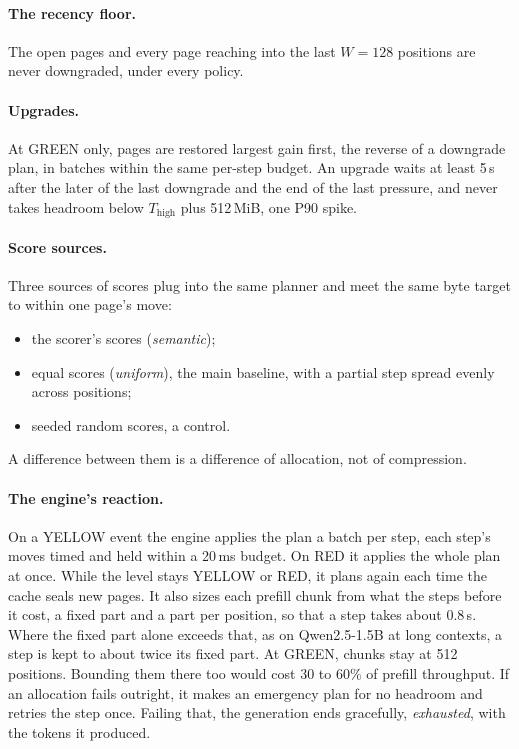 \documentclass[11pt]{article}
\begin{document}
\paragraph{The recency floor.} The open pages and every page reaching into the
last $W = 128$ positions are never downgraded, under every policy.

\paragraph{Upgrades.} At GREEN only, pages are restored largest gain first, the
reverse of a downgrade plan, in batches within the same per-step budget. An upgrade waits at least 5\,s after the later of
the last downgrade and the end of the last pressure, and never takes headroom
below $T_\mathrm{high}$ plus 512\,MiB, one P90 spike.

\paragraph{Score sources.} Three sources of scores plug into the same planner
and meet the same byte target to within one page's move:
\begin{itemize}
\item the scorer's scores (\textit{semantic});
\item equal scores (\textit{uniform}), the main baseline, with a partial step
spread evenly across positions;
\item seeded random scores, a control.
\end{itemize}
A difference between them is a difference of allocation, not of compression.

\paragraph{The engine's reaction.} On a YELLOW event the engine applies the
plan a batch per step, each step's moves timed and held within a 20\,ms
budget. On RED it applies the whole plan at once. While the level stays YELLOW
or RED, it plans again each time the cache seals new pages. It also sizes
each prefill chunk from what the steps before it cost, a fixed part and a part
per position, so that a step takes about 0.8\,s. Where the fixed part alone
exceeds that, as on Qwen2.5-1.5B at long contexts, a step is kept to about
twice its fixed part. At GREEN, chunks stay at 512 positions.
Bounding them there too would cost 30 to 60\% of prefill throughput. If an allocation
fails outright, it makes an emergency plan for no headroom and retries the step
once. Failing that, the generation ends gracefully, \textit{exhausted}, with
the tokens it produced.
\end{document}
